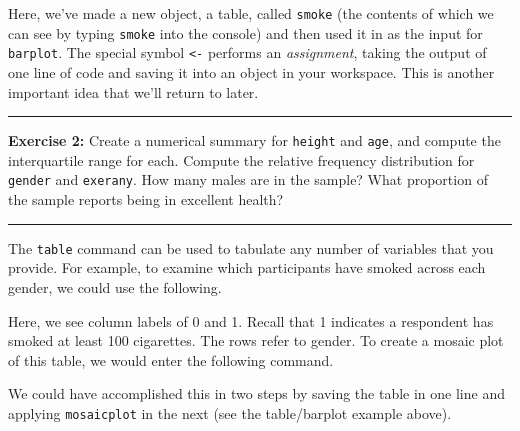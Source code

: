 \documentclass[]{book}
\newenvironment{Shaded}{\begin{snugshade}}{\end{snugshade}}
\newcommand{\KeywordTok}[1]{\textcolor[rgb]{0.13,0.29,0.53}{\textbf{#1}}}
\newcommand{\NormalTok}[1]{#1}
\newcommand{\OperatorTok}[1]{\textcolor[rgb]{0.81,0.36,0.00}{\textbf{#1}}}
\theoremstyle{definition}
\theoremstyle{definition}
\theoremstyle{definition}
\theoremstyle{remark}
\begin{document}
Here, we've made a new object, a table, called \texttt{smoke} (the
contents of which we can see by typing \texttt{smoke} into the console)
and then used it in as the input for \texttt{barplot}. The special
symbol \texttt{\textless{}-} performs an \emph{assignment}, taking the
output of one line of code and saving it into an object in your
workspace. This is another important idea that we'll return to later.

\begin{center}\rule{0.5\linewidth}{\linethickness}\end{center}

\textbf{Exercise 2:} Create a numerical summary for \texttt{height} and
\texttt{age}, and compute the interquartile range for each. Compute the
relative frequency distribution for \texttt{gender} and
\texttt{exerany}. How many males are in the sample? What proportion of
the sample reports being in excellent health?

\begin{center}\rule{0.5\linewidth}{\linethickness}\end{center}

The \texttt{table} command can be used to tabulate any number of
variables that you provide. For example, to examine which participants
have smoked across each gender, we could use the following.

\begin{Shaded}
\end{Shaded}

Here, we see column labels of 0 and 1. Recall that 1 indicates a
respondent has smoked at least 100 cigarettes. The rows refer to gender.
To create a mosaic plot of this table, we would enter the following
command.

\begin{Shaded}
\end{Shaded}

We could have accomplished this in two steps by saving the table in one
line and applying \texttt{mosaicplot} in the next (see the table/barplot
example above).
\end{document}
